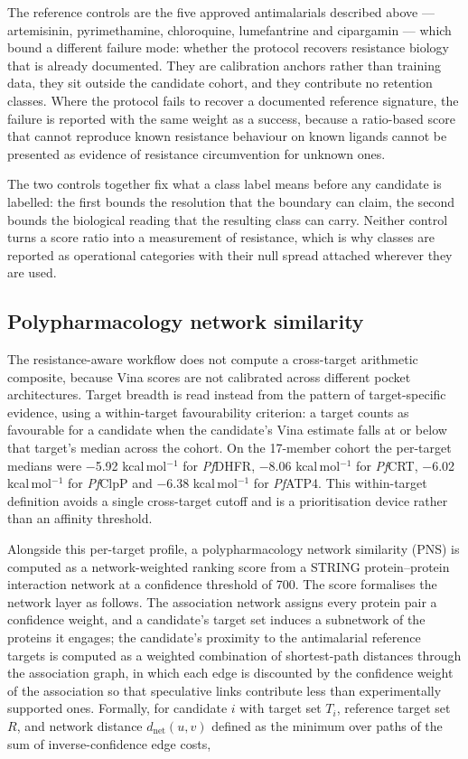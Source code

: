The reference controls are the five approved antimalarials described above --- artemisinin, pyrimethamine, chloroquine, lumefantrine and cipargamin --- which bound a different failure mode: whether the protocol recovers resistance biology that is already documented. They are calibration anchors rather than training data, they sit outside the candidate cohort, and they contribute no retention classes. Where the protocol fails to recover a documented reference signature, the failure is reported with the same weight as a success, because a ratio-based score that cannot reproduce known resistance behaviour on known ligands cannot be presented as evidence of resistance circumvention for unknown ones.

The two controls together fix what a class label means before any candidate is labelled: the first bounds the resolution that the boundary can claim, the second bounds the biological reading that the resulting class can carry. Neither control turns a score ratio into a measurement of resistance, which is why classes are reported as operational categories with their null spread attached wherever they are used.

\subsection{Polypharmacology network similarity}

The resistance-aware workflow does not compute a cross-target arithmetic composite, because Vina scores are not calibrated across different pocket architectures. Target breadth is read instead from the pattern of target-specific evidence, using a within-target favourability criterion: a target counts as favourable for a candidate when the candidate's Vina estimate falls at or below that target's median across the cohort. On the \num{17}-member cohort the per-target medians were \num{-5.92} kcal\,mol$^{-1}$ for \emph{Pf}DHFR, \num{-8.06} kcal\,mol$^{-1}$ for \emph{Pf}CRT, \num{-6.02} kcal\,mol$^{-1}$ for \emph{Pf}ClpP and \num{-6.38} kcal\,mol$^{-1}$ for \emph{Pf}ATP4. This within-target definition avoids a single cross-target cutoff and is a prioritisation device rather than an affinity threshold.

Alongside this per-target profile, a polypharmacology network similarity (PNS) is computed as a network-weighted ranking score from a STRING protein--protein interaction network at a confidence threshold of \num{700}\cite{Szklarczyk2023}. The score formalises the network layer as follows. The association network assigns every protein pair a confidence weight, and a candidate's target set induces a subnetwork of the proteins it engages; the candidate's proximity to the antimalarial reference targets is computed as a weighted combination of shortest-path distances through the association graph, in which each edge is discounted by the confidence weight of the association so that speculative links contribute less than experimentally supported ones. Formally, for candidate $i$ with target set $T_i$, reference target set $R$, and network distance $d_{\mathrm{net}}(u, v)$ defined as the minimum over paths of the sum of inverse-confidence edge costs,

